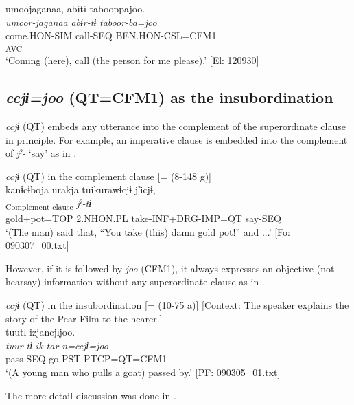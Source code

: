   \ex  
      \gllll    umoojaganaa,  abɨtɨ  tabooppajoo.\\
      \textit{umoor-jaganaa}  \textit{abɨr-tɨ}  \textit{taboor-ba=joo}\\
      come.HON-SIM  call-SEQ  BEN.HON-CSL=CFM1\\
        [Lex. verb  Aux. verb]\textsubscript{AVC}\\
      \glt ‘Coming (here), call (the person for me please).’      [El: 120930]
\z
\z

\subsection{\textit{ccjɨ=joo} (QT=CFM1) as the insubordination}\label{sec:11.2.3}

\textit{ccjɨ} (QT) embeds any utterance into the complement of the superordinate clause in principle. For example, an imperative clause is embedded into the complement of \textit{jˀ-} ‘say’ as in .

\ea\label{ex:11-10}  \textit{ccjɨ} (QT) in the complement clause [= (8-148 g)]\\
  
      \glll    kanɨcɨboja  urakja  tuikurawɨcjɨ  jˀicjɨ,\\
    [\textit{kanɨ+cɨbo=ja}  \textit{urakja}  \textit{tur-i+kuraw-ɨ=ccjɨ}]\textsubscript{Complement clause}  \textit{jˀ-tɨ}\\
    gold+pot=TOP  2.NHON.PL  take-INF+DRG-IMP=QT  say-SEQ\\
    \glt     ‘(The man) said that, “You take (this) damn gold pot!” and ...’ [Fo: 090307\_00.txt]
\z

However, if it is followed by \textit{joo} (CFM1), it always expresses an objective (not hearsay) information without any superordinate clause as in .

\ea\label{ex:11-11}  \textit{ccjɨ} (QT) in the insubordination [= (10-75 a)]   [Context: The speaker explains the story of the Pear Film to the hearer.]\\
  
      \glll    tuutɨ  izjancjɨjoo.\\
    \textit{tuur-tɨ}  \textit{ik-tar-n=ccjɨ=joo}\\
    pass-SEQ  go-PST-PTCP=QT=CFM1\\
    \glt     ‘(A young man who pulls a goat) passed by.’ [PF: 090305\_01.txt]
\z

The more detail discussion was done in .

